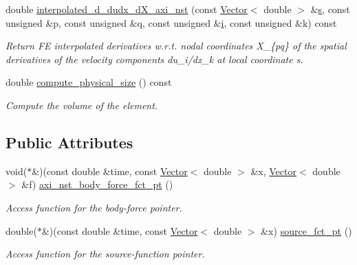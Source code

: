 \begin{DoxyCompactItemize}
\item 
double \hyperlink{classoomph_1_1GeneralisedNewtonianAxisymmetricNavierStokesEquations_a25970a1e42928fce5e110a40aa79c0de}{interpolated\+\_\+d\+\_\+dudx\+\_\+d\+X\+\_\+axi\+\_\+nst} (const \hyperlink{classoomph_1_1Vector}{Vector}$<$ double $>$ \&\hyperlink{cfortran_8h_ab7123126e4885ef647dd9c6e3807a21c}{s}, const unsigned \&p, const unsigned \&q, const unsigned \&\hyperlink{cfortran_8h_adb50e893b86b3e55e751a42eab3cba82}{i}, const unsigned \&k) const
\begin{DoxyCompactList}\small\item\em Return FE interpolated derivatives w.\+r.\+t. nodal coordinates X\+\_\+\{pq\} of the spatial derivatives of the velocity components du\+\_\+i/dx\+\_\+k at local coordinate s. \end{DoxyCompactList}\item 
double \hyperlink{classoomph_1_1GeneralisedNewtonianAxisymmetricNavierStokesEquations_a5105ddeca5782f2766dd198a3cd87e05}{compute\+\_\+physical\+\_\+size} () const
\begin{DoxyCompactList}\small\item\em Compute the volume of the element. \end{DoxyCompactList}\end{DoxyCompactItemize}
\subsection*{Public Attributes}
\begin{DoxyCompactItemize}
\item 
void($\ast$\&)(const double \&time, const \hyperlink{classoomph_1_1Vector}{Vector}$<$ double $>$ \&x, \hyperlink{classoomph_1_1Vector}{Vector}$<$ double $>$ \&f) \hyperlink{classoomph_1_1GeneralisedNewtonianAxisymmetricNavierStokesEquations_afb6954e5b57d5c68cbdf47fed6d6b940}{axi\+\_\+nst\+\_\+body\+\_\+force\+\_\+fct\+\_\+pt} ()
\begin{DoxyCompactList}\small\item\em Access function for the body-\/force pointer. \end{DoxyCompactList}\item 
double($\ast$\&)(const double \&time, const \hyperlink{classoomph_1_1Vector}{Vector}$<$ double $>$ \&x) \hyperlink{classoomph_1_1GeneralisedNewtonianAxisymmetricNavierStokesEquations_aacf1d66cd5eab06202b4504f1f382b5c}{source\+\_\+fct\+\_\+pt} ()
\begin{DoxyCompactList}\small\item\em Access function for the source-\/function pointer. \end{DoxyCompactList}\end{DoxyCompactItemize}
